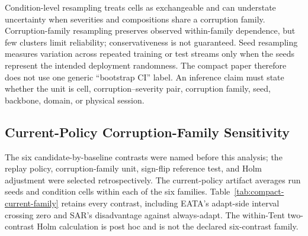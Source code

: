 Condition-level resampling treats cells as exchangeable and can understate uncertainty when
severities and compositions share a corruption family. Corruption-family resampling preserves
observed within-family dependence, but few clusters limit reliability; conservativeness is not
guaranteed. Seed resampling measures variation across repeated training or test streams only when
the seeds represent the intended deployment randomness. The compact paper therefore does not use
one generic ``bootstrap CI'' label. An inference claim must state whether the unit is cell,
corruption--severity pair, corruption family, seed, backbone, domain, or physical session.

\subsection{Current-Policy Corruption-Family Sensitivity}

The six candidate-by-baseline contrasts were named before this analysis; the replay policy,
corruption-family unit, sign-flip reference test, and Holm adjustment were selected retrospectively.
The current-policy artifact averages run seeds and condition cells within each of the six families.
Table~\ref{tab:compact-current-family} retains every contrast, including EATA's adapt-side interval
crossing zero and SAR's disadvantage against always-adapt. The within-Tent two-contrast Holm
calculation is post hoc and is not the declared six-contrast family.

\begin{table}[!t]
\centering
\scriptsize
\caption{Retrospective current-policy sensitivity over six observed CIFAR-10-C corruption families.
Each cell reports baseline regret minus KGA regret and a nominal, unadjusted 95\% family-bootstrap
interval; positive values favor KGA. Holm values adjust retrospective sign-flip reference values over six
prospectively named candidate-by-baseline contrasts. The replay, corruption-family unit, sign-flip
test, and Holm adjustment were not preregistered. The within-Tent two-contrast Holm value is
$0.03125$ but is post hoc. This table is conditional on one archived checkpoint and does not provide
verified finite-sample coverage, simultaneous intervals, independent-checkpoint inference,
prospective confirmation, natural-shift
evidence, or official POEM/AETTA superiority.}
\label{tab:compact-current-family}
\resizebox{\textwidth}{!}{}
\end{table}

